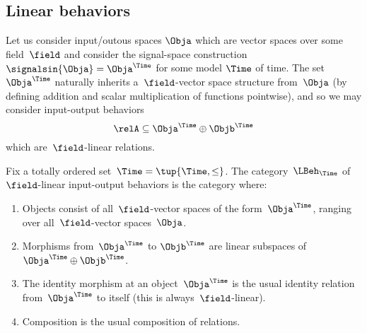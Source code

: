 



\subsection{Linear behaviors}

    Let us consider input/outous spaces $\Obja$ which are vector spaces over some field~$\field$ and consider the signal-space construction $\signalsin{\Obja} = \Obja^\Time$ for some model $\Time$ of time. The set $\Obja^\Time$ naturally inherits a~$\field$-vector space structure from~$\Obja$ (by defining addition and scalar multiplication of functions pointwise), and so we may consider input-output behaviors
    \begin{equation*}
        \relA \subseteq \Obja^\Time \oplus \Objb^\Time
    \end{equation*}
    which are~$\field$-linear relations.

    \begin{definition}
        Fix a totally ordered set~$\Time = \tup{\Time, \leq}$.
        The category~$\LBeh_\Time$ of~$\field$-linear input-output behaviors is the category where:
        \begin{enumerate}
            \item Objects consist of all~$\field$-vector spaces of the form~$\Obja^\Time$, ranging over all~$\field$-vector spaces~$\Obja$.
            \item Morphisms from~$\Obja^\Time$ to $\Objb^\Time$ are linear subspaces of~$\Obja^\Time \oplus \Objb^\Time$.
            \item The identity morphism at an object~$\Obja^\Time$ is the usual identity relation from~$\Obja^\Time$ to itself (this is always~$\field$-linear).
            \item Composition is the usual composition of relations.
        \end{enumerate}
    \end{definition}
    

